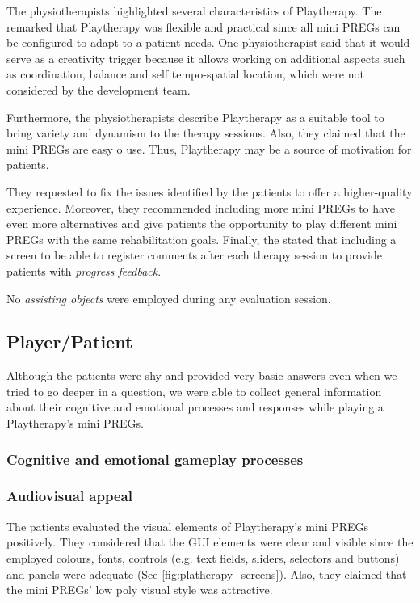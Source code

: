 The physiotherapists highlighted several characteristics of Playtherapy. The remarked that Playtherapy was flexible and practical since all mini \acp{PREG} can be configured to adapt to a patient needs. One physiotherapist said that it would serve as a creativity trigger because it allows working on additional aspects such as coordination, balance and self tempo-spatial location, which were not considered by the development team.

Furthermore, the physiotherapists describe Playtherapy as a suitable tool to bring variety and dynamism to the therapy sessions. Also, they claimed that the mini \acp{PREG} are easy o use. Thus, Playtherapy may be a source of motivation for patients.

They requested to fix the issues identified by the patients to offer a higher-quality experience. Moreover, they recommended including more mini \acp{PREG} to have even more alternatives and give patients the opportunity to play different mini \acp{PREG} with the same rehabilitation goals. Finally, the stated that including a screen to be able to register comments after each therapy session to provide patients with \textit{progress feedback}.

No \textit{assisting objects} were employed during any evaluation session.

\subsection{Player/Patient}
Although the patients were shy and provided very basic answers even when we tried to go deeper in a question, we were able to collect general information about their cognitive and emotional processes and responses while playing a Playtherapy's mini \acp{PREG}.

\subsubsection{Cognitive and emotional gameplay processes}
\subsubsection*{Audiovisual appeal}
The patients evaluated the visual elements of Playtherapy's mini \acp{PREG} positively. They considered that the \ac{GUI} elements were clear and visible since the employed colours, fonts, controls (e.g. text fields, sliders, selectors and buttons) and panels were adequate (See \autoref{fig:platherapy_screens}). Also, they claimed that the mini \acp{PREG}' low poly visual style was attractive.

